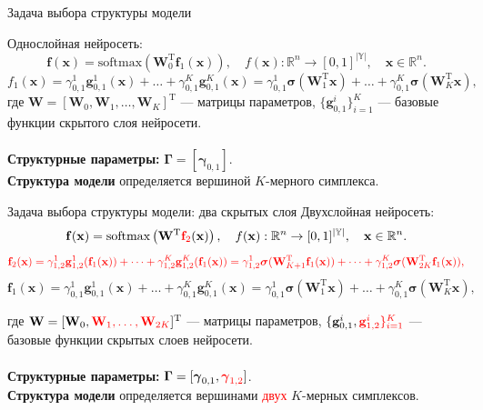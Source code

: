 \documentclass[usenames,dvipsnames,11pt,pdf,utf8,russian,aspectratio=169]{beamer}
\begin{document}
\begin{frame}{Задача выбора структуры модели}

Однослойная нейросеть:
\[
    \mathbf{f}(\mathbf{x}) = \text{softmax}\left(\mathbf{W}_0^\text{T}\mathbf{f}_1(\mathbf{x})\right), \quad f(\mathbf{x}): \mathbb{R}^n \to [0,1]^{|\mathbb{Y}|}, \quad \mathbf{x} \in \mathbb{R}^n.
\]
\[
\]
\[
{f}_1(\mathbf{x}) = {\gamma}_{0,1}^{1}\mathbf{g}_{0,1}^{1}(\mathbf{x})+\dots+{\gamma}_{0,1}^{K}\mathbf{g}_{0,1}^{K}(\mathbf{x})= {\gamma}_{0,1}^{1}\boldsymbol{\sigma}(\mathbf{W}_1^\text{T}\mathbf{x}) + \dots +  {\gamma}_{0,1}^{K}\boldsymbol{\sigma}(\mathbf{W}_K^\text{T}\mathbf{x}),
\]
где $\mathbf{W} = [\mathbf{W}_0,\mathbf{W}_1, \dots, \mathbf{W}_K]^\text{T}$ --- матрицы параметров, $\{\mathbf{g}^{i}_{0,1}\}_{i=1}^K$ --- базовые функции скрытого слоя нейросети.~\\~\\

\textbf{Структурные параметры:}  $\boldsymbol{\Gamma} = [\boldsymbol{\gamma}_{0,1}]$.\\
\textbf{Структура модели} определяется вершиной $K$-мерного симплекса.

\end{frame}

\begin{frame}{Задача выбора структуры модели: два скрытых слоя}
Двухслойная нейросеть:
\[
    \mathbf{f}(\mathbf{x}) = \text{softmax}\left(\mathbf{W}^\text{T}\textcolor{red}{\mathbf{f}_2}(\mathbf{x})\right), \quad f(\mathbf{x}): \mathbb{R}^n \to [0,1]^{|\mathbb{Y}|}, \quad \mathbf{x} \in \mathbb{R}^n.
\]
\[
\textcolor{red}{
\mathbf{f}_2(\mathbf{x}) = {\gamma}_{1,2}^{1}\mathbf{g}_{1,2}^{1}(\mathbf{f}_1(\mathbf{x}))+\dots+{\gamma}_{1,2}^{K}\mathbf{g}_{1,2}^{K}(\mathbf{f}_1(\mathbf{x}))= {\gamma}_{1,2}^{1}\boldsymbol{\sigma}(\mathbf{W}_{K+1}^\text{T}\mathbf{f}_1(\mathbf{x})) + \dots +  {\gamma}_{1,2}^{K}\boldsymbol{\sigma}(\mathbf{W}_{2K}^\text{T}\mathbf{f}_1(\mathbf{x})),}
\]
\[
\mathbf{f}_1(\mathbf{x}) = {\gamma}_{0,1}^{1}\mathbf{g}_{0,1}^{1}(\mathbf{x})+\dots+{\gamma}_{0,1}^{K}\mathbf{g}_{0,1}^{K}(\mathbf{x})= {\gamma}_{0,1}^{1}\boldsymbol{\sigma}(\mathbf{W}_1^\text{T}\mathbf{x}) + \dots +  {\gamma}_{0,1}^{K}\boldsymbol{\sigma}(\mathbf{W}_K^\text{T}\mathbf{x}),
\]

где $\mathbf{W} = [\mathbf{W}_0,\textcolor{red}{\mathbf{W}_1, \dots, \mathbf{W}_{2K}}]^{\text{T}}$ --- матрицы параметров, $\{\mathbf{g}^{i}_{0,1}, \textcolor{red}{\mathbf{g}^{i}_{1,2}\}_{i=1}^K}$ --- базовые функции скрытых слоев нейросети.~\\~\\

\textbf{Структурные параметры:} $\boldsymbol{\Gamma} = [\boldsymbol{\gamma}_{0,1}, \textcolor{red}{\boldsymbol{\gamma}_{1,2}}]$.\\
\textbf{Структура модели} определяется вершинами \textcolor{red}{двух} $K$-мерных симплексов.
\end{frame}
        
\end{document}
